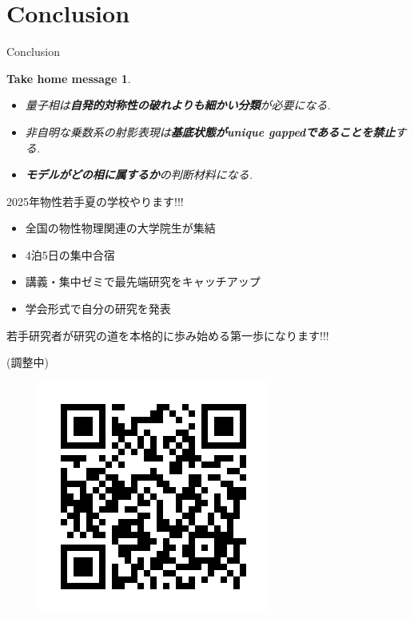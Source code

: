 \documentclass[dvipdfm]{beamer}
\newtheorem*{takehome}{Take home message}
\begin{document}
\section{Conclusion}

\begin{frame}{Conclusion}
    \begin{takehome}
        \begin{itemize}
            \item 量子相は\textbf{\alert{自発的対称性の破れよりも細かい分類}}が必要になる.
            \item 非自明な乗数系の射影表現は\textbf{\alert{基底状態がunique gappedであることを禁止}}する.
            \item \textbf{\alert{モデルがどの相に属するか}}の判断材料になる.
        \end{itemize}
    \end{takehome}



\end{frame}

\begin{frame}{2025年物性若手夏の学校やります!!!}
    \begin{itemize}
        \item 全国の物性物理関連の大学院生が集結
        \item 4泊5日の集中合宿
        \item 講義・集中ゼミで最先端研究をキャッチアップ
        \item 学会形式で自分の研究を発表
    \end{itemize}
    若手研究者が研究の道を本格的に歩み始める第一歩になります!!!

    \textbf{}

    \textbf{}(調整中)
    \begin{figure}
        \centering
        \includegraphics[width=0.2\linewidth]{QR_736654.png}
    \end{figure}
\end{frame}
\end{document}
